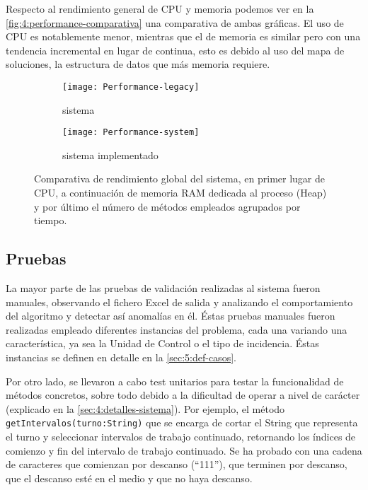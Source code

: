 
Respecto al rendimiento general de CPU y memoria podemos ver en la \autoref{fig:4:performance-comparativa} una comparativa de ambas gráficas. El uso de CPU es notablemente menor, mientras que el de memoria es similar pero con una tendencia incremental en lugar de continua, esto es debido al uso del mapa de soluciones, la estructura de datos que más memoria requiere.


\begin{figure}
	\centering
	\begin{subfigure}{\linewidth}
		\centering
		\texttt{[image: Performance-legacy]}
		\caption{sistema \legacy{}}
		\label{fig:4:performance-legacy}
	\end{subfigure}
	
	\begin{subfigure}{\linewidth}
		\centering
		\texttt{[image: Performance-system]}
		\caption{sistema implementado}
		\label{fig:4:performance-system}
	\end{subfigure}
	
	\caption[Comparativa de rendimiento global del sistema]{Comparativa de rendimiento global del sistema, en primer lugar de CPU, a continuación de memoria RAM dedicada al proceso (Heap) y por último el número de métodos empleados agrupados por tiempo.}
	\label{fig:4:performance-comparativa}
\end{figure}



\subsection{Pruebas}
\label{sec:4:tests}

La mayor parte de las pruebas de validación realizadas al sistema fueron manuales, observando el fichero Excel de salida y analizando el comportamiento del algoritmo y detectar así anomalías en él. Éstas pruebas manuales fueron realizadas empleado diferentes instancias del problema, cada una variando una característica, ya sea la Unidad de Control o el tipo de incidencia. Éstas instancias se definen en detalle en la \autoref{sec:5:def-casos}.

Por otro lado, se llevaron a cabo test unitarios para testar la funcionalidad de métodos concretos, sobre todo debido a la dificultad de operar a nivel de carácter (explicado en la \autoref{sec:4:detalles-sistema}).
Por ejemplo, el método \texttt{getIntervalos(turno:String)} que se encarga de cortar el String que representa el turno y seleccionar intervalos de trabajo continuado, retornando los índices de comienzo y fin del intervalo de trabajo continuado. Se ha probado con una cadena de caracteres que comienzan por descanso (``111''), que terminen por descanso, que el descanso esté en el medio y que no haya descanso.

